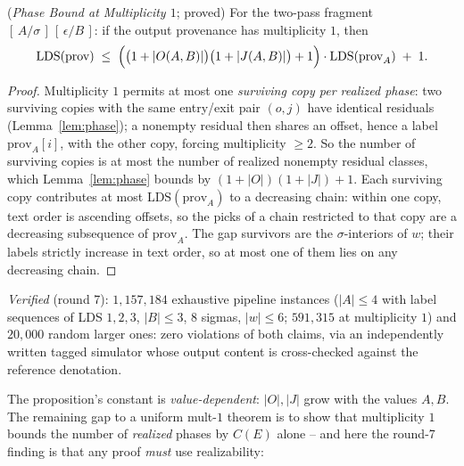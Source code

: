 \begin{proposition}
    (\emph{Phase Bound at Multiplicity $1$}; proved)
    \label{prop:phasebound}
    For the two-pass fragment $[\,A/\sigma\,]\,[\,\epsilon/B\,]$: if the
    output provenance has multiplicity $1$, then
    \[
        \mathrm{LDS}(\mathrm{prov}) \;\leq\;
        \Bigl(\bigl(1 + |O(A,B)|\bigr)\bigl(1 + |J(A,B)|\bigr) +
        1\Bigr) \cdot \mathrm{LDS}(\mathrm{prov}_A) \;+\; 1 .
    \]
\end{proposition}

\begin{proof}
    Multiplicity $1$ permits at most one \emph{surviving copy per
    realized phase}: two surviving copies with the same entry/exit
    pair $(o,j)$ have identical residuals (Lemma~\ref{lem:phase}); a
    nonempty residual then shares an offset, hence a label
    $\mathrm{prov}_A[i]$, with the other copy, forcing multiplicity
    $\geq 2$.  So the number of surviving copies is at most the number
    of realized nonempty residual classes, which
    Lemma~\ref{lem:phase} bounds by $(1+|O|)(1+|J|)+1$.  Each
    surviving copy contributes at most $\mathrm{LDS}(\mathrm{prov}_A)$
    to a decreasing chain: within one copy, text order is ascending
    offsets, so the picks of a chain restricted to that copy are a
    decreasing subsequence of $\mathrm{prov}_A$.  The gap survivors
    are the $\sigma$-interiors of $w$; their labels strictly increase
    in text order, so at most one of them lies on any decreasing chain.
\end{proof}

\noindent \emph{Verified} (round 7): $1{,}157{,}184$ exhaustive
pipeline instances ($|A| \leq 4$ with label sequences of LDS $1,2,3$,
$|B| \leq 3$, $8$ sigmas, $|w| \leq 6$; $591{,}315$ at multiplicity
$1$) and $20{,}000$ random larger ones: zero violations of both
claims, via an independently written tagged simulator whose output
content is cross-checked against the reference denotation.

The proposition's constant is \emph{value-dependent}: $|O|, |J|$ grow
with the values $A, B$.  The remaining gap to a uniform mult-$1$
theorem is to show that multiplicity $1$ bounds the number of
\emph{realized} phases by $C(E)$ alone -- and here the round-7
finding is that any proof \emph{must} use realizability:

